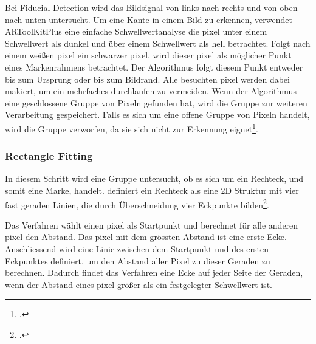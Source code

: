 Bei Fiducial Detection wird das Bildsignal von links nach rechts und von oben nach unten untersucht. Um eine Kante in
 einem Bild zu erkennen, verwendet ARToolKitPlus eine einfache Schwellwertanalyse die \gls{pixel} unter einem
 Schwellwert als dunkel und über einem Schwellwert als hell betrachtet. Folgt nach einem weißen \gls{pixel} ein
 schwarzer \gls{pixel}, wird dieser \gls{pixel} als möglicher Punkt eines Markenrahmens betrachtet. Der Algorithmus
 folgt diesem Punkt entweder bis zum Ursprung oder bis zum Bildrand. Alle besuchten \gls{pixel} werden dabei makiert,
 um ein mehrfaches durchlaufen zu vermeiden. Wenn der Algorithmus eine geschlossene Gruppe von Pixeln gefunden
 hat, wird die Gruppe zur weiteren Verarbeitung gespeichert. Falls es sich um eine offene Gruppe von Pixeln
 handelt, wird die Gruppe verworfen, da sie sich nicht zur Erkennung eignet\footcite[Vgl.][S.~41--42]{wagner07a}.

\begin{comment}
	TODO: Erwähne Labeling/Bildregion erkennen aus Burger
	TODO: arGetContour gehört auch noch dazu (8er Nachbarschaft)
\end{comment}



\subsubsection{Rectangle Fitting} %
\label{sub:rectangle_fitting}

In diesem Schritt wird eine Gruppe untersucht, ob es sich um ein Rechteck, und somit eine Marke, handelt.
 \citeauthor{wagner07a} definiert ein Rechteck als eine 2D Struktur mit vier fast geraden Linien, die durch
 Überschneidung vier Eckpunkte bilden\footcite[Vgl.][S.~42]{wagner07a}.

Das Verfahren wählt einen \gls{pixel} als Startpunkt und berechnet für alle anderen \gls{pixel} den Abstand. Das
 \gls{pixel} mit dem grössten Abstand ist eine erste Ecke. Anschliessend wird eine Linie zwischen dem Startpunkt und
 des ersten Eckpunktes definiert, um den Abstand aller Pixel zu dieser Geraden zu berechnen. Dadurch findet das
 Verfahren eine Ecke auf jeder Seite der Geraden, wenn der Abstand eines \gls{pixel} größer als ein festgelegter
 Schwellwert ist.

\begin{comment}
	- Eckpunkte entlang der Region finden
	 - Abbruch: keine ecken mehr oder mehr als 4 ecken
	- Nur exakt 4 ecken sind ein rechteck

	Eckpunkte finden:
	- Wähle ersten Pixel aus und berechne die Distanz aller anderen Pixel
	- der Punkt mit der größten Distanz ist ein erster Eckpunkt
	- Untersuche alle Pixel zwischen dem ersten Pixel und ersten Eckpunkt, Pixel mit größtem Abstand ist ein weiterer Eckpunkt
	- rekursiv wiederholen, für linke seite/rechte seite
\end{comment}

